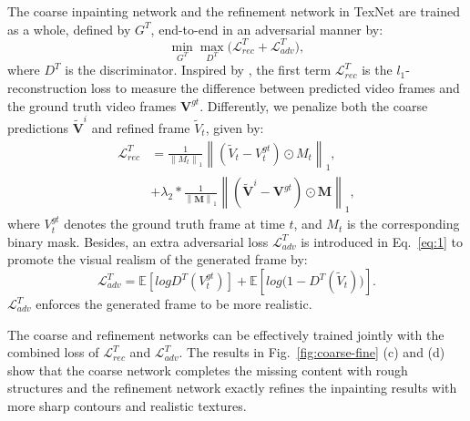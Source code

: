 The coarse inpainting network and the refinement network in TexNet are trained as a whole, defined by $G^T$, end-to-end in an adversarial manner by:
%
\begin{equation}
	\label{eq:1}
	\min\limits_{G^T} \max \limits_{D^T} \big(\mathcal{L}^{T}_{rec}+\mathcal{L}^T_{adv}\big),
\end{equation}
where $D^T$ is the discriminator.
%
Inspired by \cite{nazeri2019edgeconnect}, the first term $\mathcal{L}^{T}_{rec}$ is the $l_1$-reconstruction loss to measure the difference between predicted video frames and the ground truth video frames $\boldsymbol{V}^{gt}$.
Differently, we penalize both the coarse predictions $\boldsymbol{\widetilde{V}}^i$ and refined frame $\widetilde{V}_t$, given by:
\begin{equation}
		\label{eq:loss_rec}
	\begin{aligned}
		\mathcal{L}^{T}_{rec}&=\frac{1}{\left\|M_t \right\|_1}\left\|(\widetilde{V}_t-V^{gt}_t)\odot M_t\right\|_1,\\ 
		&+\lambda_2*\frac{1}{\left\|\boldsymbol{M} \right\|_1}\left\|(\boldsymbol{\widetilde{V}}^i-\boldsymbol{V}^{gt})\odot \boldsymbol{M}\right\|_1,
	\end{aligned}
\end{equation}
where $V^{gt}_t$ denotes the ground truth frame at time $t$, and $M_t$ is the corresponding binary mask. 
%
%
Besides, an extra adversarial loss $\mathcal{L}^T_{adv}$ is introduced in Eq.~\eqref{eq:1} to promote the visual realism of the generated frame
 by:
	\begin{equation}
		\label{eq:inp_adver}
		\mathcal{L}^T_{adv}=\mathbb{E}[logD^T(V^{gt}_t)]+\mathbb{E}[log\big(1-D^T(\widetilde{V}_t)\big)].
	\end{equation}
$\mathcal{L}^T_{adv}$ enforces the generated frame to be more realistic.


The coarse and refinement networks can be effectively trained jointly with the combined loss of $\mathcal{L}^T_{rec}$ and $\mathcal{L}^T_{adv}$.
The results in Fig.~\ref{fig:coarse-fine} (c) and (d) show that the coarse network completes the missing content with rough structures and the refinement network exactly refines the inpainting results with more sharp contours and realistic textures.




